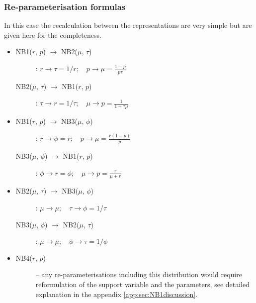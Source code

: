 {\subsubsection{Re-parameterisation formulas}
In this case the recalculation between the representations are very simple
but are given here for the completeness.
\begin{itemize}
\item 
\begin{description}
\item[NB1($r$, $p$) $\rightarrow$ NB2($\mu$, $\tau$)]:
$r \rightarrow \tau = 1/r; \quad p \rightarrow \mu = \frac{1-p}{p\tau}$

\item[NB2($\mu$, $\tau$) $\rightarrow$ NB1($r$, $p$)]:
$\tau \rightarrow r=1/\tau; \quad \mu \rightarrow p = \frac{1}{1+\tau \mu}$
\end{description}

\item 
\begin{description}
\item[NB1($r$, $p$) $\rightarrow$ NB3($\mu$, $\phi$)]:
$r \rightarrow \phi=r; \quad p \rightarrow \mu=\frac{r (1-p)}{p}$

\item[NB3($\mu$, $\phi$) $\rightarrow$ NB1($r$, $p$)]:
$\phi \rightarrow r=\phi; \quad \mu \rightarrow p=\frac{r}{\mu+r}$
\end{description}

\item 
\begin{description}
\item[NB2($\mu$, $\tau$) $\rightarrow$ NB3($\mu$, $\phi$)]:
$\mu \rightarrow \mu; \quad \tau \rightarrow \phi=1/\tau$

\item[NB3($\mu$, $\phi$) $\rightarrow$ NB2($\mu$, $\tau$)]:
$\mu \rightarrow \mu; \quad \phi \rightarrow \tau=1/\phi$
\end{description}

\item 
\begin{description}
\item[NB4($r$, $p$)] -- any re-parameterisations including this distribution 
would require reformulation of the support variable and the parameters,
see detailed explanation in the appendix \ref{app:sec:NB1discussion}. 
\end{description}

\end{itemize}



}
